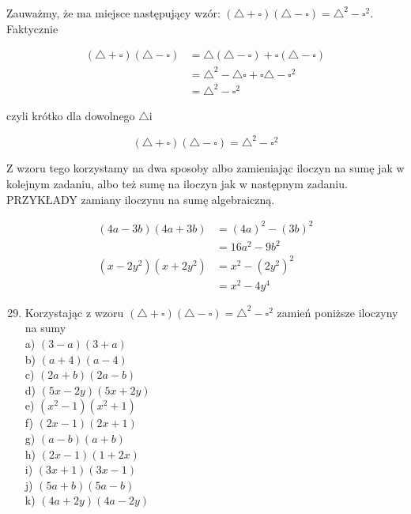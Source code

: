 \documentclass[10pt]{article}
\begin{document}
Zauważmy, że ma miejsce następujący wzór: \((\triangle+\square)(\triangle-\square)=\triangle^{2}-\square^{2}\). Faktycznie

\[
\begin{aligned}
(\triangle+\square)(\triangle-\square) & =\triangle(\triangle-\square)+\square(\triangle-\square) \\
& =\triangle^{2}-\triangle \square+\square \triangle-\square^{2} \\
& =\triangle^{2}-\square^{2}
\end{aligned}
\]

czyli krótko dla dowolnego \(\triangle \mathrm{i}\)

\[
(\triangle+\square)(\triangle-\square)=\triangle^{2}-\square^{2}
\]

Z wzoru tego korzystamy na dwa sposoby albo zamieniając iloczyn na sumę jak w kolejnym zadaniu, albo też sumę na iloczyn jak w następnym zadaniu. PRZYKŁADY zamiany iloczynu na sumę algebraiczną.

\[
\begin{aligned}
(4 a-3 b)(4 a+3 b) & =(4 a)^{2}-(3 b)^{2} \\
& =16 a^{2}-9 b^{2} \\
\left(x-2 y^{2}\right)\left(x+2 y^{2}\right) & =x^{2}-\left(2 y^{2}\right)^{2} \\
& =x^{2}-4 y^{4}
\end{aligned}
\]

\begin{enumerate}
  \setcounter{enumi}{28}
  \item Korzystając z wzoru \((\triangle+\square)(\triangle-\square)=\triangle^{2}-\square^{2}\) zamień poniższe iloczyny na sumy\\
a) \((3-a)(3+a)\)\\
b) \((a+4)(a-4)\)\\
c) \((2 a+b)(2 a-b)\)\\
d) \((5 x-2 y)(5 x+2 y)\)\\
e) \(\left(x^{2}-1\right)\left(x^{2}+1\right)\)\\
f) \((2 x-1)(2 x+1)\)\\
g) \((a-b)(a+b)\)\\
h) \((2 x-1)(1+2 x)\)\\
i) \((3 x+1)(3 x-1)\)\\
j) \((5 a+b)(5 a-b)\)\\
k) \((4 a+2 y)(4 a-2 y)\)
\end{enumerate}
\end{document}
